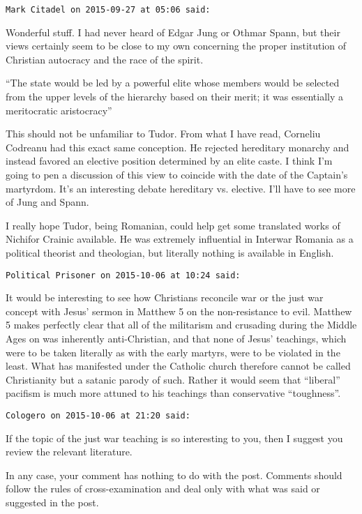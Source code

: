 \begin{footnotesize}\begin{sffamily}

\texttt{Mark Citadel on 2015-09-27 at 05:06 said: }

Wonderful stuff. I had never heard of Edgar Jung or Othmar Spann, but their views certainly seem to be close to my own
concerning the proper institution of Christian autocracy and the race of the spirit. 

“The state would be led by a powerful elite whose members would be selected from the upper levels of the hierarchy based
on their merit; it was essentially a meritocratic aristocracy”

This should not be unfamiliar to Tudor. From what I have read, Corneliu Codreanu had this exact same conception. He
rejected hereditary monarchy and instead favored an elective position determined by an elite caste. I think
I'm going to pen a discussion of this view to coincide with the date of the Captain's
martyrdom. It's an interesting debate hereditary vs. elective. I'll have to see more of Jung
and Spann.

I really hope Tudor, being Romanian, could help get some translated works of Nichifor Crainic available. He was
extremely influential in Interwar Romania as a political theorist and theologian, but literally nothing is available in
English.


\hfill

\texttt{Political Prisoner on 2015-10-06 at 10:24 said: }

It would be interesting to see how Christians reconcile war or the just war concept with Jesus' sermon in
Matthew 5 on the non-resistance to evil. Matthew 5 makes perfectly clear that all of the militarism and crusading
during the Middle Ages on was inherently anti-Christian, and that none of Jesus' teachings, which were to
be taken literally as with the early martyrs, were to be violated in the least. What has manifested under the Catholic
church therefore cannot be called Christianity but a satanic parody of such. Rather it would seem that “liberal”
pacifism is much more attuned to his teachings than conservative “toughness”.


\hfill

\texttt{Cologero on 2015-10-06 at 21:20 said: }

If the topic of the just war teaching is so interesting to you, then I suggest you review the relevant literature.

In any case, your comment has nothing to do with the post. Comments should follow the rules of cross-examination and
deal only with what was said or suggested in the post.


\end{sffamily}
\end{footnotesize}
